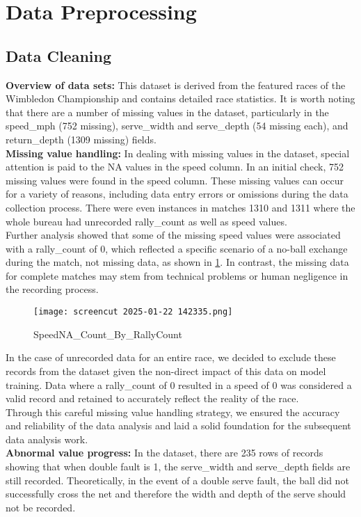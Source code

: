 \documentclass{mcmthesis}
\begin{document}
\section{Data Preprocessing} 

\subsection{Data Cleaning}

{\bf Overview of data sets:} This dataset is derived from the featured races of the Wimbledon Championship and contains detailed race statistics.
 It is worth noting that there are a number of missing values in the dataset, particularly in the speed\_mph (752 missing), serve\_width and
serve\_depth (54 missing each), and return\_depth (1309 missing) fields. \\
{\bf Missing value handling: }In dealing with missing values in the dataset, special attention is
paid to the NA values in the speed column. In an initial check, 752 missing values were found in
the speed column. These missing values can occur for a variety of reasons, including data entry
errors or omissions during the data collection process. There were even instances in matches 1310
and 1311 where the whole bureau had unrecorded rally\_count as well as speed values. \\
Further analysis showed that some of the missing speed values were associated with a
rally\_count of 0, which reflected a specific scenario of a no-ball exchange during the match, not
missing data, as shown in \ref{Figure 1}. In contrast, the missing data for complete matches may stem
from technical problems or human negligence in the recording process.

\begin{figure}[htbp]
    \centering
    \texttt{[image: screencut 2025-01-22 142335.png]}
    \caption{SpeedNA\_Count\_By\_RallyCount} \label{Figure 1}
\end{figure}


In the case of unrecorded data for an entire race, we decided to exclude these records from
the dataset given the non-direct impact of this data on model training. Data where a rally\_count of
0 resulted in a speed of 0 was considered a valid record and retained to accurately reflect the
reality of the race. \\
Through this careful missing value handling strategy, we ensured the accuracy and reliability
of the data analysis and laid a solid foundation for the subsequent data analysis work. \\
{\bf Abnormal value progress:} In the dataset, there are 235 rows of records showing that when
double fault is 1, the serve\_width and serve\_depth fields are still recorded. Theoretically, in the
event of a double serve fault, the ball did not successfully cross the net and therefore the width and
depth of the serve should not be recorded.
\end{document}
